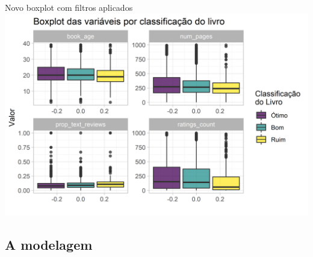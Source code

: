 \documentclass[
  9 pt,
  ignorenonframetext,
]{beamer}
\begin{document}
\begin{frame}{Novo boxplot com filtros aplicados}
\includegraphics{apresentacao_files/figure-beamer/unnamed-chunk-11-1.png}
\end{frame}

\hypertarget{a-modelagem}{%
\subsection{A modelagem}\label{a-modelagem}}
\end{document}
